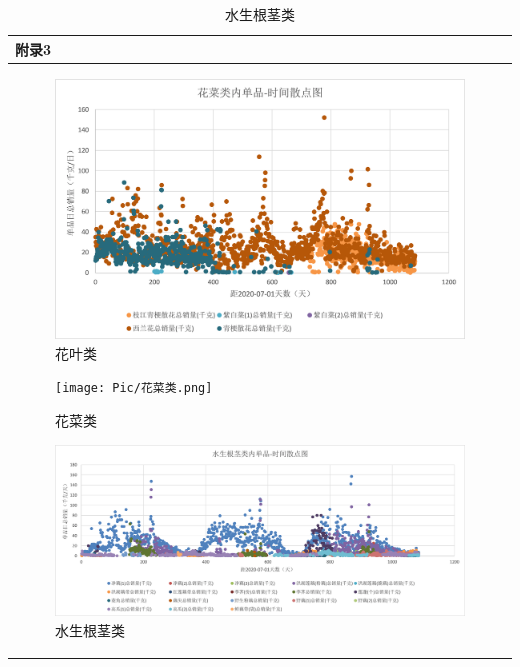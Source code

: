 \documentclass{my_paper}
\begin{document}
\begin{table}[H]
    \centering
    \begin{tabular}{|p{14.0cm}|}
    \hline
    \textbf{附录3} \\ 
    \hline

\begin{figure}[H]
 \centering
 \includegraphics[width=\textwidth]{Pic/花叶类.png} %
 \caption{花叶类} %
 \label{花叶类} %
\end{figure}

\begin{figure}[H]
 \centering
 \texttt{[image: Pic/花菜类.png]} %
 \caption{花菜类} %
 \label{花菜类} %
\end{figure}

\begin{figure}[H]
 \centering
 \includegraphics[width=\textwidth]{Pic/水生根茎类.png} %
 \caption{水生根茎类} %
 \label{水生根茎类} %
\end{figure}


\end{tabular}
\end{table}
\end{document}
